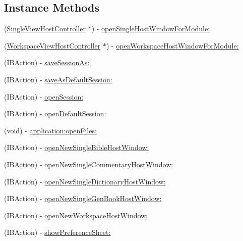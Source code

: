 \subsection*{Instance Methods}
\begin{DoxyCompactItemize}
\item 
(\hyperlink{interface_single_view_host_controller}{Single\-View\-Host\-Controller} $\ast$) -\/ \hyperlink{interface_app_controller_accffd91b00f6b5aeb08330cc609aee86}{open\-Single\-Host\-Window\-For\-Module\-:}
\item 
(\hyperlink{interface_workspace_view_host_controller}{Workspace\-View\-Host\-Controller} $\ast$) -\/ \hyperlink{interface_app_controller_a55dfc114e92acbe7bd08b7ee40cce7a2}{open\-Workspace\-Host\-Window\-For\-Module\-:}
\item 
(I\-B\-Action) -\/ \hyperlink{interface_app_controller_a49e32bfd5a391d220c10d79bbd06eec8}{save\-Session\-As\-:}
\item 
(I\-B\-Action) -\/ \hyperlink{interface_app_controller_a293c3e2f4696fd296d73ad0c0eb220ff}{save\-As\-Default\-Session\-:}
\item 
(I\-B\-Action) -\/ \hyperlink{interface_app_controller_af59521d7cc8746312deb89b9127cdd81}{open\-Session\-:}
\item 
(I\-B\-Action) -\/ \hyperlink{interface_app_controller_a2007805ff3a7df6ead5de45d89d71b5a}{open\-Default\-Session\-:}
\item 
(void) -\/ \hyperlink{interface_app_controller_a284929cdebde6753975af6ffebc60385}{application\-:open\-Files\-:}
\item 
(I\-B\-Action) -\/ \hyperlink{interface_app_controller_ad931ff9d54355b502c379cc05e441bb8}{open\-New\-Single\-Bible\-Host\-Window\-:}
\item 
(I\-B\-Action) -\/ \hyperlink{interface_app_controller_ac3a5b476b8b913997019f5b50110890d}{open\-New\-Single\-Commentary\-Host\-Window\-:}
\item 
(I\-B\-Action) -\/ \hyperlink{interface_app_controller_af3aaba0d02adcf04c082d0e33a02560d}{open\-New\-Single\-Dictionary\-Host\-Window\-:}
\item 
(I\-B\-Action) -\/ \hyperlink{interface_app_controller_ad77df322b22ef445c5527c8efd41e979}{open\-New\-Single\-Gen\-Book\-Host\-Window\-:}
\item 
(I\-B\-Action) -\/ \hyperlink{interface_app_controller_adcc586ceba279d1ba9ce6b565fe7e474}{open\-New\-Workspace\-Host\-Window\-:}
\item 
(I\-B\-Action) -\/ \hyperlink{interface_app_controller_abd2d7d361a93c6f4f256271f15d8e6ae}{show\-Preference\-Sheet\-:}

\end{DoxyCompactItemize}
